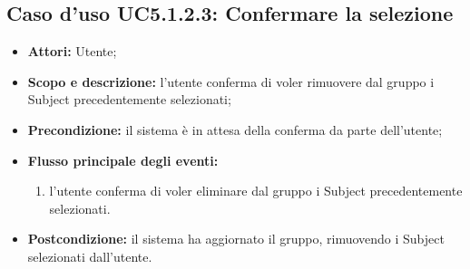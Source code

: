 \subsection{Caso d'uso UC5.1.2.3: Confermare la selezione}
\begin{itemize}
\item \textbf{Attori:} Utente;
\item \textbf{Scopo e descrizione:} l'utente conferma di voler rimuovere dal gruppo i Subject\glossario{} precedentemente selezionati;
\item \textbf{Precondizione:} il sistema è in attesa della conferma da parte dell'utente;
\item \textbf{Flusso principale degli eventi:}
\begin{enumerate}
\item l'utente conferma di voler eliminare dal gruppo i Subject\glossario{} precedentemente selezionati.
\end{enumerate}
\item \textbf{Postcondizione:} il sistema ha aggiornato il gruppo, rimuovendo i Subject\glossario{} selezionati dall'utente.
\end{itemize}



